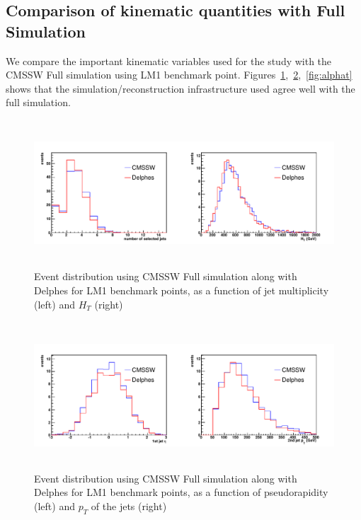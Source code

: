 \subsection*{Comparison of kinematic quantities with Full Simulation}
\label{sec:compare}
We compare the important kinematic variables used for the study with the CMSSW 
Full simulation using LM1 benchmark point. Figures~\ref{fig:njetht},~\ref{fig:jetpteta},~\ref{fig:alphat}
shows that the simulation/reconstruction infrastructure used agree well with the full simulation.

\begin{figure}[htbp]
\begin{center}
\includegraphics[height=5.5cm]{figs/njetht.pdf} 
\caption{Event distribution using CMSSW Full simulation along with Delphes for LM1 benchmark points, 
as a function of jet multiplicity (left) and $H_T$ (right)}
\label{fig:njetht}
\end{center}
\end{figure}


\begin{figure}[htbp]
\begin{center}
\includegraphics[height=5.5cm]{figs/jet1pteta.pdf} 
\caption{Event distribution using CMSSW Full simulation along with Delphes for LM1 benchmark points, 
as a function of pseudorapidity (left) and $p_T$ of the jets (right)}
\label{fig:jetpteta}
\end{center}
\end{figure}

